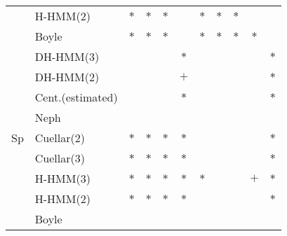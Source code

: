 \documentclass[landscape, 8pt]{report}
\begin{document}
\begin{table}[h!]
\begin{center}
\begin{tabular}{ llccccccccc }
    & H-HMM(2) & $*$ & $*$ & $*$ &     & $*$ & $*$ & $*$ &     &     \\
    & Boyle & $*$ & $*$ & $*$ &     & $*$ & $*$ & $*$ & $*$ &     \\
  \hline
    \multirow{9}{*}{\begin{sideways}Sp\end{sideways}}
    & DH-HMM(3) &     &     &     & $*$ &     &     &     &     & $*$ \\
    & DH-HMM(2) &     &     &     & $+$ &     &     &     &     & $*$ \\
    & Cent.(estimated) &     &     &     & $*$ &     &     &     &     & $*$ \\
    & Neph &     &     &     &     &     &     &     &     &     \\
    & Cuellar(2) & $*$ & $*$ & $*$ & $*$ &     &     &     &     & $*$ \\
    & Cuellar(3) & $*$ & $*$ & $*$ & $*$ &     &     &     &     & $*$ \\
    & H-HMM(3) & $*$ & $*$ & $*$ & $*$ & $*$ &     &     & $+$ & $*$ \\
    & H-HMM(2) & $*$ & $*$ & $*$ & $*$ &     &     &     &     & $*$ \\
    & Boyle &     &     &     &     &     &     &     &     &     \\
  \hline
  \end{tabular}
\end{center}
\vspace{0.0cm}
\end{table}
\end{document}
